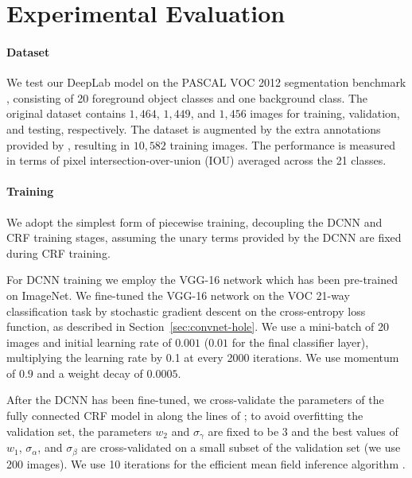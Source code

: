 \section{Experimental Evaluation}
\label{sec:experiments}

\paragraph{Dataset} We test our DeepLab model on the PASCAL VOC 2012 segmentation benchmark \citep{everingham2014pascal}, consisting of 20 foreground object classes and one background class. The original dataset contains $1,464$, $1,449$, and $1,456$ images for training, validation, and testing, respectively. The dataset is augmented by the extra annotations provided by \citet{hariharan2011semantic}, resulting in $10,582$ training images. The performance is measured in terms of pixel intersection-over-union (IOU) averaged across the 21 classes. 

\paragraph{Training} We adopt the simplest form of piecewise training, decoupling the DCNN and CRF training stages, assuming the unary terms provided by the DCNN are fixed during CRF training. 

For DCNN training we employ the VGG-16 network which has been pre-trained on ImageNet. We fine-tuned the VGG-16 network on the VOC 21-way classification task by stochastic gradient descent on the cross-entropy loss function, as described in Section~\ref{sec:convnet-hole}. We use a mini-batch of 20 images and initial learning rate of $0.001$ ($0.01$ for the final classifier layer), multiplying the learning rate by 0.1 at every 2000 iterations. We use momentum of $0.9$ and a weight decay of $0.0005$.

After the DCNN has been fine-tuned, we cross-validate the parameters of the fully connected CRF model in  along the lines of \citet{krahenbuhl2011efficient};
 to avoid overfitting the validation set, the parameters $w_2$ and $\sigma_\gamma$ are fixed to be $3$ and the best values of $w_1$, $\sigma_\alpha$, and $\sigma_\beta$ are cross-validated on a small subset of the validation set (we use 200 images). We use 10 iterations for the efficient mean field inference algorithm \citep{krahenbuhl2011efficient}. 

